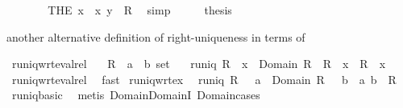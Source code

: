 \begin{isabellebody}
\ \ \isamarkupfalse%
\ \isamarkupfalse%
\ {\isachardoublequoteopen}{\isasymdots}\ {\isacharequal}\ {\isacharparenleft}THE\ x\ {\isachardot}\ {\isacharparenleft}x{\isacharcomma}\ y{\isacharparenright}\ {\isasymin}\ R{\isacharparenright}{\isachardoublequoteclose}\ \isamarkupfalse%
\ simp\isanewline
\ \ \isamarkupfalse%
\ \isamarkupfalse%
\ {\isacharquery}thesis\ \isacommand{{\isachardot}}\isamarkupfalse%
\isanewline
{}\isamarkupfalse%
%
\endisatagproof
{\isafoldproof}%
%
\isadelimproof
%
\endisadelimproof
%
\begin{isamarkuptext}%
another alternative definition of right-uniqueness in terms of %
\end{isamarkuptext}%
\isamarkuptrue%
\isamarkupfalse%
\ runiq{\isacharunderscore}wrt{\isacharunderscore}eval{\isacharunderscore}rel{\isacharprime}{\isacharcolon}\isanewline
\ \ \ R\ {\isacharcolon}{\isacharcolon}\ {\isachardoublequoteopen}{\isacharparenleft}{\isacharprime}a\ {\isasymtimes}\ {\isacharprime}b{\isacharparenright}\ set{\isachardoublequoteclose}\isanewline
\ \ \ {\isachardoublequoteopen}runiq\ R\ {\isasymlongleftrightarrow}\ {\isacharparenleft}{\isasymforall}x\ {\isasymin}\ Domain\ R\ {\isachardot}\ R\ {\isacharbackquote}{\isacharbackquote}\ {\isacharbraceleft}x{\isacharbraceright}\ {\isacharequal}\ {\isacharbraceleft}R\ {\isacharcomma}{\isacharcomma}\ x{\isacharbraceright}{\isacharparenright}{\isachardoublequoteclose}%
\isadelimproof
\ %
\endisadelimproof
%
\isatagproof
{}\isamarkupfalse%
\ runiq{\isacharunderscore}wrt{\isacharunderscore}eval{\isacharunderscore}rel\ \isamarkupfalse%
\ fast%
\endisatagproof
{\isafoldproof}%
%
\isadelimproof
%
\endisadelimproof
\isanewline
\isanewline
{}\isamarkupfalse%
\ runiq{\isacharunderscore}wrt{\isacharunderscore}ex{}{\isacharcolon}\isanewline
\ \ {\isachardoublequoteopen}runiq\ R\ {\isasymlongleftrightarrow}\ {\isacharparenleft}{\isasymforall}\ a\ {\isasymin}\ Domain\ R\ {\isachardot}\ {\isasymexists}{\isacharbang}\ b\ {\isachardot}\ {\isacharparenleft}a{\isacharcomma}\ b{\isacharparenright}\ {\isasymin}\ R{\isacharparenright}{\isachardoublequoteclose}\isanewline
%
\isadelimproof
%
\endisadelimproof
%
\isatagproof
{}\isamarkupfalse%
\ runiq{\isacharunderscore}basic\ \isamarkupfalse%
\ {\isacharparenleft}metis\ Domain{\isachardot}DomainI\ Domain{\isachardot}cases{\isacharparenright}%

\end{isabellebody}
